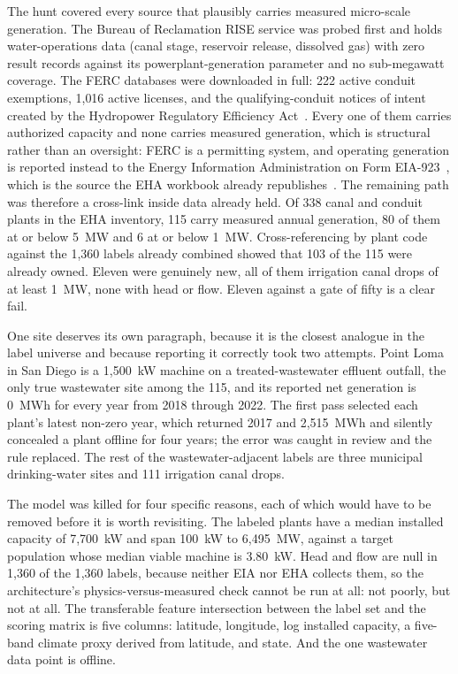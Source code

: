 \documentclass[12pt,letterpaper]{report}
\begin{document}
The hunt covered every source that plausibly carries measured micro-scale
generation. The Bureau of Reclamation RISE service was probed first and holds
water-operations data (canal stage, reservoir release, dissolved gas) with
zero result records against its powerplant-generation parameter and no sub-megawatt
coverage. The FERC databases were downloaded in full: 222 active conduit
exemptions, 1{,}016 active licenses, and the qualifying-conduit notices of intent
created by the Hydropower Regulatory Efficiency Act~\cite{ferc_conduit}. Every one
of them carries authorized capacity and none carries measured generation, which
is structural rather than an oversight: FERC is a permitting system, and operating
generation is reported instead to the Energy Information Administration on Form
EIA-923~\cite{eia923}, which is the source the EHA workbook already
republishes~\cite{hydrosource_eha}. The remaining path was therefore a cross-link
inside data already held. Of 338 canal and conduit plants in the EHA inventory,
115 carry measured annual generation, 80 of them at or below 5~MW and 6 at or
below 1~MW. Cross-referencing by plant code against the 1{,}360 labels already
combined showed that 103 of the 115 were already owned. Eleven were genuinely
new, all of them irrigation canal drops of at least 1~MW, none with head or flow.
Eleven against a gate of fifty is a clear fail.

One site deserves its own paragraph, because it is the closest analogue in the
label universe and because reporting it correctly took two attempts. Point Loma
in San Diego is a 1{,}500~kW machine on a treated-wastewater effluent outfall,
the only true wastewater site among the 115, and its reported net generation is
0~MWh for every year from 2018 through 2022. The first pass selected each plant's
latest non-zero year, which returned 2017 and 2{,}515~MWh and silently concealed
a plant offline for four years; the error was caught in review and the rule
replaced. The rest of the wastewater-adjacent labels are three municipal
drinking-water sites and 111 irrigation canal drops.

The model was killed for four specific reasons, each of which would have to be
removed before it is worth revisiting. The labeled plants have a median installed
capacity of 7{,}700~kW and span 100~kW to 6{,}495~MW, against a target population
whose median viable machine is 3.80~kW. Head and flow are null in 1{,}360 of the
1{,}360 labels, because neither EIA nor EHA collects them, so the architecture's
physics-versus-measured check cannot be run at all: not poorly, but not at
all. The transferable feature intersection between the label set and the scoring
matrix is five columns: latitude, longitude, log installed capacity, a five-band
climate proxy derived from latitude, and state. And the one wastewater data point
is offline.
\end{document}
